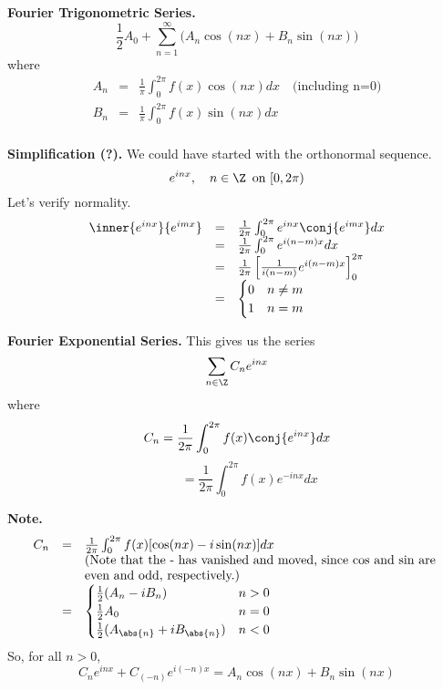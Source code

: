 \documentclass[a5paper]{article}
\theoremstyle{definition}%
\numberwithin{exercise}{section}
\theoremstyle{remark}%
\begin{document}
\textbf{Fourier Trigonometric Series.} 
$$\frac{1}{2}A_0+\sum_{n=1}^\infty\bigg(A_n\cos(nx)+B_n\sin(nx)\bigg)$$
where
\[\begin{array}{rcl}
A_n &=& \frac{1}{\pi}\int_{0}^{2\pi} {f(x)}{\cos(nx)}dx \quad\text{(including n=0)}\\
B_n &=& \frac{1}{\pi}\int_{0}^{2\pi} {f(x)}{\sin(nx)}dx\\
\end{array}\]

\textbf{Simplification (?).} We could have started with the orthonormal sequence.
$$e^{inx}, \quad n\in \Z \, \text{ on } [0,2\pi)$$
Let's verify normality.
\[\begin{array}{rcl}
\inner{e^{inx}}{e^{imx}}&=&\frac{1}{2\pi}\int_0^{2\pi} e^{inx}\conj{e^{imx}}dx\\
&=&\frac{1}{2\pi}\int_0^{2\pi} e^{i(n-m)x}dx\\
&=&\frac{1}{2\pi} \left[\frac{1}{i(n-m)} e^{i(n-m)x}\right]_0^{2\pi}\\
&=&
	\begin{cases}
	0& n\neq m\\
	1& n=m\\
	\end{cases}
\end{array} \]

\begin{highlight}
\textbf{Fourier Exponential Series.}
This gives us the series
$$\sum_{n\in\Z}C_ne^{inx}$$
where
$$C_n=\frac{1}{2\pi}\int_0^{2\pi}f(x)\conj{e^{inx}}dx$$
$$\phantom{-C_n}=\frac{1}{2\pi}\int_0^{2\pi}f(x){e^{-inx}}dx$$
\end{highlight}

\textbf{Note.} 
\[\begin{array}{rcl}
C_n &=& \frac{1}{2\pi} \int_0^{2\pi} f(x) [\cos(nx)-i\sin(nx)] dx\\
&& \text{(Note that the - has vanished and moved, since cos and sin are }\\
&&\text{even and odd, respectively.)}\\
&=&
\begin{cases}
\frac{1}{2}(A_n-iB_n) & n>0\\
\frac{1}{2} A_0 & n=0\\
\frac{1}{2}(A_{\abs{n}}+iB_{\abs{n}}) & n<0\\
\end{cases}
\end{array} \]
So, for all $n>0$, 
$$C_ne^{inx}+C_{(-n)}e^{i(-n)x}=A_n\cos(nx)+B_n\sin(nx)$$
\end{document}
